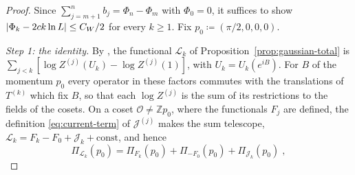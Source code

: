 \documentclass[11pt]{preprint}
\DeclarePairedDelimiter{\abs}{\lvert}{\rvert}
\numberwithin{equation}{section}
\theoremstyle{definition}
\theoremstyle{remark}
\theoremstyle{plain}
\begin{document}
\begin{proof}
Since $\sum_{j=m+1}^nb_j = \Phi_n - \Phi_m$ with $\Phi_0 = 0$, it suffices to show $\abs{\Phi_k - 2ck\ln L} \leq C_W/2$ for every $k \geq 1$. Fix $p_0 \coloneqq (\pi/2, 0, 0, 0)$.

\emph{Step 1: the identity.} By \cite[(1.3), p.~260, and (1.6), p.~261]{BalabanRG1}, the functional $\mathcal L_k$ of Proposition~\ref{prop:gaussian-total} is $\sum_{j<k}[\log Z^{(j)}(U_k) - \log Z^{(j)}(1)]$, with $U_k = U_k(e^{iB})$. For $B$ of the momentum $p_0$ every operator in these factors commutes with the translations of $T^{(k)}$ which fix $B$, so that each $\log Z^{(j)}$ is the sum of its restrictions to the fields of the cosets. On a coset $\mathcal O \neq \mathbb Zp_0$, where the functionals $F_j$ are defined, the definition \eqref{eq:current-term} of $\mathcal J^{(j)}$ makes the sum telescope, $\mathcal L_k = F_k - F_0 + \mathcal J_k + \mathrm{const}$, and hence
\begin{equation}\label{eq:window-identity}
    \Pi_{\mathcal L_k}(p_0) = \Pi_{F_k}(p_0) + \Pi_{-F_0}(p_0) + \Pi_{\mathcal J_k}(p_0)\;,
\end{equation}

\end{proof}
\end{document}
